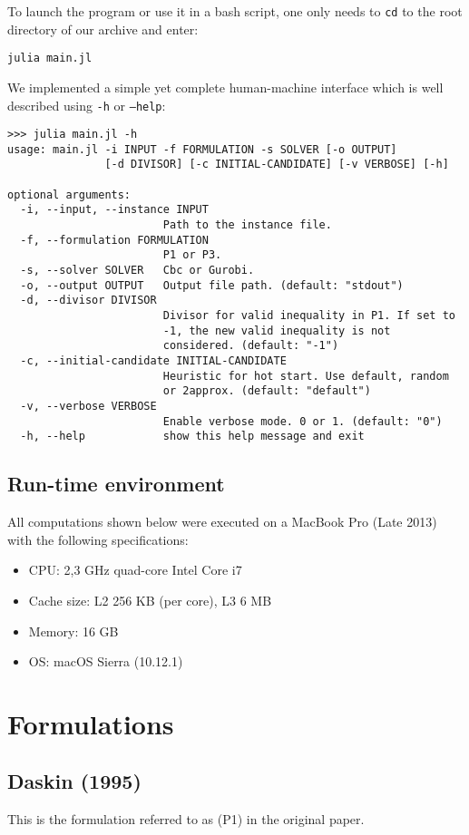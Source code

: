 \documentclass[a4paper,10pt]{article}
\begin{document}
To launch the program or use it in a bash script, one only needs to \texttt{cd} to the root directory of our archive and enter:

\begin{lstlisting}
julia main.jl
\end{lstlisting}

We implemented a simple yet complete human-machine interface which is well described using \texttt{-h} or \texttt{--help}:
\begin{lstlisting}
>>> julia main.jl -h
usage: main.jl -i INPUT -f FORMULATION -s SOLVER [-o OUTPUT]
               [-d DIVISOR] [-c INITIAL-CANDIDATE] [-v VERBOSE] [-h]

optional arguments:
  -i, --input, --instance INPUT
                        Path to the instance file.
  -f, --formulation FORMULATION
                        P1 or P3.
  -s, --solver SOLVER   Cbc or Gurobi.
  -o, --output OUTPUT   Output file path. (default: "stdout")
  -d, --divisor DIVISOR
                        Divisor for valid inequality in P1. If set to
                        -1, the new valid inequality is not
                        considered. (default: "-1")
  -c, --initial-candidate INITIAL-CANDIDATE
                        Heuristic for hot start. Use default, random
                        or 2approx. (default: "default")
  -v, --verbose VERBOSE
                        Enable verbose mode. 0 or 1. (default: "0")
  -h, --help            show this help message and exit
\end{lstlisting}

\subsection{Run-time environment}
All computations shown below were executed on a MacBook Pro (Late 2013) with the following specifications:
\begin{itemize}
	\item CPU: 2,3 GHz quad-core Intel Core i7
	\item Cache size: L2 256 KB (per core), L3 6 MB
	\item Memory: 16 GB
	\item OS: macOS Sierra (10.12.1)
\end{itemize}


\section{Formulations}
\subsection{Daskin (1995)}
	This is the formulation referred to as (P1) in the original paper.
	
\end{document}
